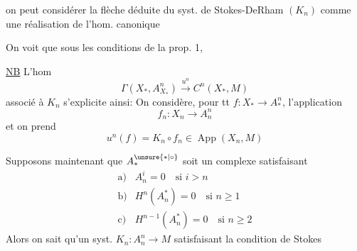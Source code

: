 
on peut considérer la flèche
déduite du syst. de Stokes-DeRham $(K_n)$ comme une réalisation de l'hom. canonique

On voit que sous les conditions de la prop. 1, 


\uline{NB} L'hom
\[
\Gamma(X_*,A^n_{X_*})\xrightarrow{u^n}C^n(X_*,M)
\]
associé à $K_n$ s'explicite ainsi: On considère, pour tt   $f:X_*\longrightarrow A_*^n$, l'application
\[
f_n:X_n\longrightarrow A_n^n
\]
et on prend
\[
u^n(f)=K_n\circ f_n\in\operatorname{App}(X_n,M)
\]


Supposons maintenant que $A_*^{\unsure{*|\circ}}$ soit un complexe  satisfaisant
\[
\begin{array}{ll}
\mathrm{a)}& A_n^i=0\quad\text{si }i>n\\
\mathrm{b)}& H^n(A_n^*)=0\quad\text{si }n\geq1\\
\mathrm{c)}& H^{n-1}(A_n^*)=0\quad\text{si }n\geq2
\end{array}
\]
Alors on sait qu'un syst. $K_n:A_n^n\longrightarrow M$ satisfaisant la condition de Stokes

